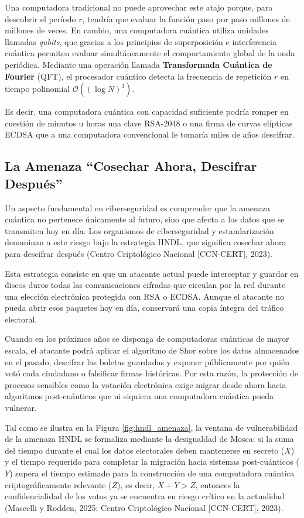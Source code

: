 Una computadora tradicional no puede aprovechar este atajo porque, para descubrir el período $r$, tendría que evaluar la función paso por paso millones de millones de veces. En cambio, una computadora cuántica utiliza unidades llamadas \textit{qubits}, que gracias a los principios de superposición e interferencia cuántica permiten evaluar simultáneamente el comportamiento global de la onda periódica. Mediante una operación llamada \textbf{Transformada Cuántica de Fourier} (QFT), el procesador cuántico detecta la frecuencia de repetición $r$ en tiempo polinomial $\mathcal{O}((\log N)^3)$.

Es decir, una computadora cuántica con capacidad suficiente podría romper en cuestión de minutos u horas una clave RSA-2048 o una firma de curvas elípticas ECDSA que a una computadora convencional le tomaría miles de años descifrar.

\subsection{La Amenaza ``Cosechar Ahora, Descifrar Después''}

Un aspecto fundamental en ciberseguridad es comprender que la amenaza cuántica no pertenece únicamente al futuro, sino que afecta a los datos que se transmiten hoy en día. Los organismos de ciberseguridad y estandarización denominan a este riesgo bajo la estrategia HNDL, que significa cosechar ahora para descifrar después (Centro Criptológico Nacional [CCN-CERT], 2023).

Esta estrategia consiste en que un atacante actual puede interceptar y guardar en discos duros todas las comunicaciones cifradas que circulan por la red durante una elección electrónica protegida con RSA o ECDSA. Aunque el atacante no pueda abrir esos paquetes hoy en día, conservará una copia íntegra del tráfico electoral.

Cuando en los próximos años se disponga de computadoras cuánticas de mayor escala, el atacante podrá aplicar el algoritmo de Shor sobre los datos almacenados en el pasado, descifrar las boletas guardadas y exponer públicamente por quién votó cada ciudadano o falsificar firmas históricas. Por esta razón, la protección de procesos sensibles como la votación electrónica exige migrar desde ahora hacia algoritmos post-cuánticos que ni siquiera una computadora cuántica pueda vulnerar.

Tal como se ilustra en la Figura \ref{fig:hndl_amenaza}, la ventana de vulnerabilidad de la amenaza HNDL se formaliza mediante la desigualdad de Mosca: si la suma del tiempo durante el cual los datos electorales deben mantenerse en secreto ($X$) y el tiempo requerido para completar la migración hacia sistemas post-cuánticos ($Y$) supera el tiempo estimado para la construcción de una computadora cuántica criptográficamente relevante ($Z$), es decir, $X + Y > Z$, entonces la confidencialidad de los votos ya se encuentra en riesgo crítico en la actualidad (Mascelli y Rodden, 2025; Centro Criptológico Nacional [CCN-CERT], 2023).

